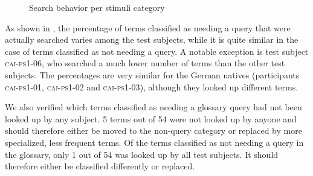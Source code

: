 \documentclass[output=paper]{langsci/langscibook}
\begin{document}
\begin{figure}
\caption{Search behavior per stimuli category\label{fig:prandi:9}}
\end{figure}

As shown in , the percentage of terms classified as needing a query that were actually searched varies among the test subjects, while it is quite similar in the case of terms classified as not needing a query. A notable exception is test subject \textsc{cai}-\textsc{ps1-06}, who searched a much lower number of terms than the other test subjects. The percentages are very similar for the German natives (participants \textsc{cai}-\textsc{ps1-01}, \textsc{cai}-\textsc{ps1-02} and \textsc{cai-ps1-03}), although they looked up different terms.

We also verified which terms classified as needing a glossary query had not been looked up by any subject. 5 terms out of 54 were not looked up by anyone and should therefore either be moved to the non-query category or replaced by more specialized, less frequent terms. Of the terms classified as not needing a query in the glossary, only 1 out of 54 was looked up by all test subjects. It should therefore either be classified differently or replaced. 
\end{document}
